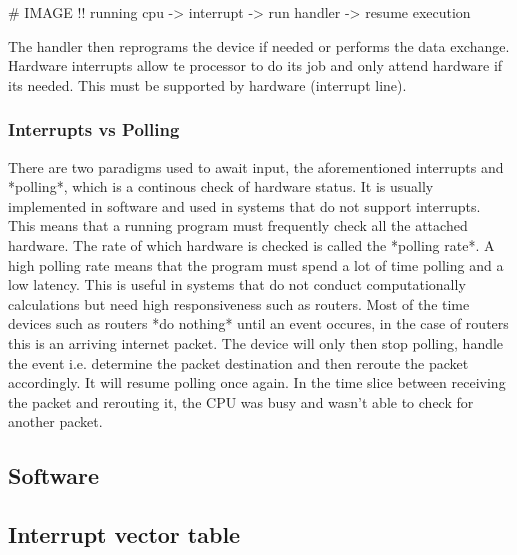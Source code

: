 # IMAGE !!
running cpu -> interrupt -> run handler -> resume execution

The handler then reprograms the device if needed or performs the data exchange. Hardware 
interrupts allow te processor to do its job and only attend hardware if its needed. This
must be supported by hardware (interrupt line).

\subsubsection{Interrupts vs Polling}

There are two paradigms used to await input, the aforementioned interrupts and *polling*, 
which is a continous check of hardware status. It is usually implemented in software and 
used in systems that do not support interrupts. This means that a running program must 
frequently check all the attached hardware. The rate of which hardware is checked is called 
the *polling rate*. A high polling rate means that the program must spend a lot of time 
polling and a low latency. This is useful in systems that do not conduct computationally
calculations but need high responsiveness such as routers. Most of the time devices such as 
routers *do nothing* until an event occures, in the case of routers this is an arriving 
internet packet. The device will only then stop polling, handle the event i.e. determine 
the packet destination and then reroute the packet accordingly. It will resume polling once 
again. In the time slice between receiving the packet and rerouting it, the CPU was busy and
wasn't able to check for another packet. 

\subsection{Software}

\subsection{Interrupt vector table}

